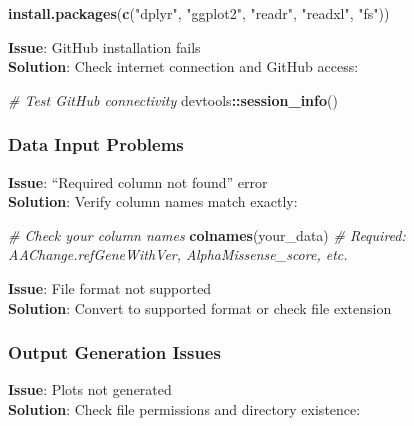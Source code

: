 \documentclass[
  11pt,
]{article}
\newenvironment{Shaded}{\begin{snugshade}}{\end{snugshade}}
\newcommand{\CommentTok}[1]{\textcolor[rgb]{0.56,0.35,0.01}{\textit{#1}}}
\newcommand{\FunctionTok}[1]{\textcolor[rgb]{0.13,0.29,0.53}{\textbf{#1}}}
\newcommand{\NormalTok}[1]{#1}
\newcommand{\SpecialCharTok}[1]{\textcolor[rgb]{0.81,0.36,0.00}{\textbf{#1}}}
\newcommand{\StringTok}[1]{\textcolor[rgb]{0.31,0.60,0.02}{#1}}
\begin{document}
\begin{Shaded}
\begin{Highlighting}[]
\FunctionTok{install.packages}\NormalTok{(}\FunctionTok{c}\NormalTok{(}\StringTok{"dplyr"}\NormalTok{, }\StringTok{"ggplot2"}\NormalTok{, }\StringTok{"readr"}\NormalTok{, }\StringTok{"readxl"}\NormalTok{, }\StringTok{"fs"}\NormalTok{))}
\end{Highlighting}
\end{Shaded}

\textbf{Issue}: GitHub installation fails\\
\textbf{Solution}: Check internet connection and GitHub access:

\begin{Shaded}
\begin{Highlighting}[]
\CommentTok{\# Test GitHub connectivity}
\NormalTok{devtools}\SpecialCharTok{::}\FunctionTok{session\_info}\NormalTok{()}
\end{Highlighting}
\end{Shaded}

\subsubsection{Data Input Problems}\label{data-input-problems}

\textbf{Issue}: ``Required column not found'' error\\
\textbf{Solution}: Verify column names match exactly:

\begin{Shaded}
\begin{Highlighting}[]
\CommentTok{\# Check your column names}
\FunctionTok{colnames}\NormalTok{(your\_data)}
\CommentTok{\# Required: AAChange.refGeneWithVer, AlphaMissense\_score, etc.}
\end{Highlighting}
\end{Shaded}

\textbf{Issue}: File format not supported\\
\textbf{Solution}: Convert to supported format or check file extension

\subsubsection{Output Generation Issues}\label{output-generation-issues}

\textbf{Issue}: Plots not generated\\
\textbf{Solution}: Check file permissions and directory existence:
\end{document}
